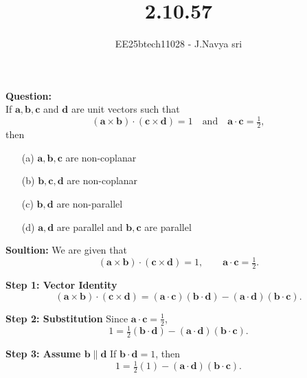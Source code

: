 \documentclass[journal]{IEEEtran}
\begin{document}

\vspace{3cm}

\title{2.10.57}
\author{EE25btech11028 - J.Navya sri}
{\let\newpage\relax\maketitle}


\textbf{Question:} \\
If $\mathbf{a}, \mathbf{b}, \mathbf{c}$ and $\mathbf{d}$ are unit vectors such that 
\[
(\mathbf{a} \times \mathbf{b}) \cdot (\mathbf{c} \times \mathbf{d}) = 1
\quad \text{and} \quad 
\mathbf{a} \cdot \mathbf{c} = \tfrac{1}{2},
\]
then

\begin{enumerate}
    \item[(a)] $\mathbf{a}, \mathbf{b}, \mathbf{c}$ are non-coplanar
    \item[(b)] $\mathbf{b}, \mathbf{c}, \mathbf{d}$ are non-coplanar
    \item[(c)] $\mathbf{b}, \mathbf{d}$ are non-parallel
    \item[(d)] $\mathbf{a}, \mathbf{d}$ are parallel and $\mathbf{b}, \mathbf{c}$ are parallel
\end{enumerate}

\textbf{Soultion:}
We are given that 
\begin{equation}
(\mathbf{a} \times \mathbf{b}) \cdot (\mathbf{c} \times \mathbf{d}) = 1,
\qquad 
\mathbf{a} \cdot \mathbf{c} = \tfrac{1}{2}.
\end{equation}

\textbf{Step 1: Vector Identity}
\begin{equation}
(\mathbf{a} \times \mathbf{b}) \cdot (\mathbf{c} \times \mathbf{d})
= (\mathbf{a} \cdot \mathbf{c})(\mathbf{b} \cdot \mathbf{d}) 
- (\mathbf{a} \cdot \mathbf{d})(\mathbf{b} \cdot \mathbf{c}).
\end{equation}

\textbf{Step 2: Substitution}
Since $\mathbf{a}\cdot \mathbf{c}=\tfrac12$,
\begin{equation}
1 = \tfrac12 (\mathbf{b} \cdot \mathbf{d}) - (\mathbf{a} \cdot \mathbf{d})(\mathbf{b} \cdot \mathbf{c}).
\end{equation}

\textbf{Step 3: Assume $\mathbf{b} \parallel \mathbf{d}$}
If $\mathbf{b} \cdot \mathbf{d} = 1$, then
\begin{equation}
1 = \tfrac12 (1) - (\mathbf{a} \cdot \mathbf{d})(\mathbf{b} \cdot \mathbf{c}).
\end{equation}
\end{document}
